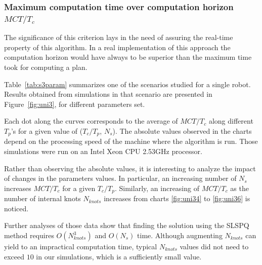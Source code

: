 \documentclass[eprint]{actapoly}
\begin{document}
\subsubsection{Maximum computation time over computation horizon $MCT/T_c$}

The significance of this criterion lays in the need of assuring the 
real-time property of this algorithm.
In a real implementation of this approach the computation horizon would have 
always to be superior than the
maximum time took for computing a plan.


Table~\ref{tab:s3param} summarizes one of the scenarios studied for a 
single robot. Results obtained from simulations in 
that scenario are presented in Figure~\ref{fig:uni3}, for different parameters set.

Each dot along the curves corresponds to the average of $MCT/T_c$ along different $T_p$'s for a given value of ($T_c/T_p$, $N_s$).
The absolute values observed in the charts depend on the processing speed of the machine
where the algorithm is run. Those simulations were run on an Intel Xeon CPU 2.53GHz processor.

Rather than observing the absolute values, it is interesting to analyze the impact of 
changes in the parameters values. In particular, an increasing number of $N_s$ 
increases $MCT/T_c$ for a 
given $T_c/T_p$. Similarly, an increasing of $MCT/T_c$ as the number of
internal knots $N_{knots}$ increases from charts \ref{fig:uni34} to \ref{fig:uni36} is 
noticed.

Further analyses of those data show that finding the solution using the SLSPQ method
requires $O(N_{knots}^3)$ and $O(N_s)$ time. Although augmenting $N_{knots}$ can yield
to an impractical computation time, typical $N_{knots}$ values did not need to exceed $10$ in our simulations, which is a sufficiently small value.
\end{document}
